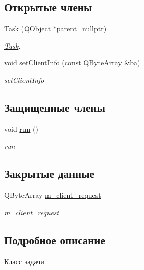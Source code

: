 \subsection*{Открытые члены}
\begin{DoxyCompactItemize}
\item 
\hyperlink{classTask_a14c504e1e0ecef1a22429d6bf80771ac}{Task} (Q\+Object $\ast$parent=nullptr)
\begin{DoxyCompactList}\small\item\em \hyperlink{classTask}{Task}. \end{DoxyCompactList}\item 
void \hyperlink{classTask_a332a2afecfed5236f3e4246a788943a1}{set\+Client\+Info} (const Q\+Byte\+Array \&ba)
\begin{DoxyCompactList}\small\item\em set\+Client\+Info \end{DoxyCompactList}\end{DoxyCompactItemize}
\subsection*{Защищенные члены}
\begin{DoxyCompactItemize}
\item 
void \hyperlink{classTask_a034b41e0d81a3dc01804bbc3f73a25f2}{run} ()
\begin{DoxyCompactList}\small\item\em run \end{DoxyCompactList}\end{DoxyCompactItemize}
\subsection*{Закрытые данные}
\begin{DoxyCompactItemize}
\item 
Q\+Byte\+Array \hyperlink{classTask_ac961587d9c0cc627b69ead09f2311834}{m\+\_\+client\+\_\+request}
\begin{DoxyCompactList}\small\item\em m\+\_\+client\+\_\+request \end{DoxyCompactList}\end{DoxyCompactItemize}


\subsection{Подробное описание}
Класс задачи 

